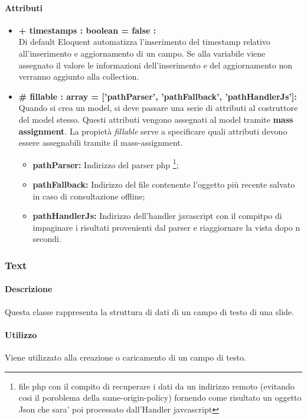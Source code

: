 	\paragraph{Attributi}
	\begin{itemize}
		\item \textbf{+ timestamps : boolean = false :}\\
		Di default Eloquent automatizza l'inserimento del timestamp relativo all'inserimento e aggiornamento di un campo. Se alla variabile viene assegnato il valore le informazioni dell'inserimento e del aggiornamento non verranno aggiunto alla collection.
		\item \textbf{\# fillable : array = ['pathParser’, ’pathFallback’, ’pathHandlerJs']:}\\
		Quando si crea un model, si deve passare una serie di attributi al costruttore del model stesso. Questi attributi vengono assegnati al model tramite \textbf{mass assignment}. La propietà \textit{fillable} serve a specificare quali attributi devono essere assegnabili tramite il mass-assignment.
		\begin{itemize}
			\item \textbf{pathParser:} Indirizzo del parser php \footnote{file php con il compito di recuperare i dati da un indirizzo remoto (evitando cosi il poroblema della same-origin-policy) fornendo come risultato un oggetto Json che sara' poi processato dall'Handler javcascript};
			\item \textbf{pathFallback:} Indirizzo del file contenente l'oggetto più recente salvato in caso di consultazione offline;
			\item \textbf{pathHandlerJs:} Indirizzo dell'handler javascript con il compitpo di impaginare i risultati provenienti dal parser e riaggiornare la vista dopo n secondi.
		\end{itemize}
	\end{itemize}
\newpage


\subsubsection{Text}


	\paragraph{Descrizione}
	Questa classe rappresenta la struttura di dati di un campo di testo di una slide.
	
	\paragraph{Utilizzo}
	Viene utilizzato alla creazione o caricamento di un campo di testo.
	

